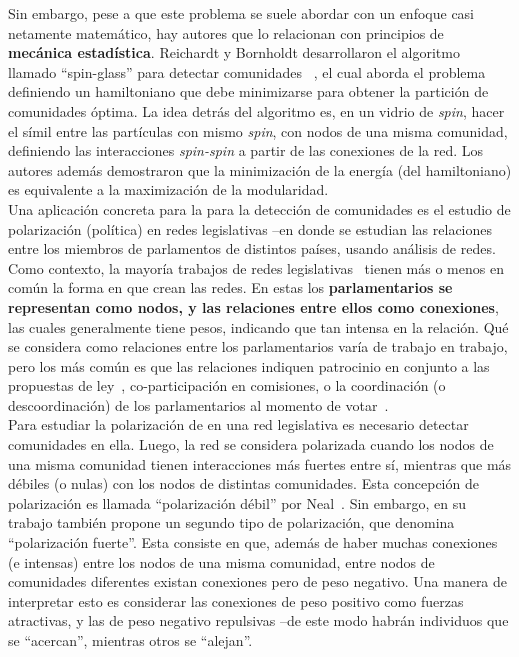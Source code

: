 \documentclass{proyectotesis}
\begin{document}
Sin embargo, pese a que este problema se suele abordar con un enfoque casi netamente matemático, hay autores que lo relacionan con principios de \textbf{mecánica estadística}. Reichardt y Bornholdt desarrollaron el algoritmo llamado ``spin-glass'' para detectar comunidades ~\cite{reichardt_statistical_2006}, el cual aborda el problema definiendo un hamiltoniano que debe minimizarse para obtener la partición de comunidades óptima. La idea detrás del algoritmo es, en un vidrio de \textit{spin}, hacer el símil entre las partículas con mismo \textit{spin}, con nodos de una misma comunidad, definiendo las interacciones \textit{spin-spin} a partir de las conexiones de la red. Los autores además demostraron que la minimización de la energía (del hamiltoniano) es equivalente a la maximización de la modularidad.\\

Una aplicación concreta para la para la detección de comunidades es el estudio de polarización (política) en redes legislativas --en donde se estudian las relaciones entre los miembros de  parlamentos de distintos países, usando análisis de redes.\\

Como contexto, la mayoría trabajos de redes legislativas~\cite{neal_sign_2020, marenco_time_2020, intal_dissent_2021, schoch_legislators_2020, aleman_explaining_2013, zhang_community_2007, fowler_connecting_2007, andris_rise_2015, briatte_network_2016, le_foulon_moran_cooperation_2020}
tienen más o menos en común la forma en que crean las redes. En estas los \textbf{parlamentarios se representan como nodos, y las relaciones entre ellos como conexiones}, las cuales generalmente tiene pesos, indicando que tan intensa en la relación. Qué se considera como relaciones entre los parlamentarios varía de trabajo en trabajo, pero los más común es que las relaciones indiquen patrocinio en conjunto a las propuestas de ley~\cite{neal_sign_2020, zhang_community_2007, le_foulon_moran_cooperation_2020,fowler_connecting_2007}, co-participación en comisiones, o la coordinación (o descoordinación) de los parlamentarios al momento de votar~\cite{andris_rise_2015, marenco_time_2020, schoch_legislators_2020, intal_dissent_2021}.\\

Para estudiar la polarización de en una red legislativa es necesario detectar comunidades en ella. Luego, la red se considera polarizada cuando los nodos de una misma comunidad tienen interacciones más fuertes entre sí, mientras que más débiles (o nulas) con los nodos de distintas comunidades. Esta concepción de polarización es llamada ``polarización débil'' por Neal~\cite{neal_sign_2020}. Sin embargo, en su trabajo también propone un segundo tipo de polarización, que denomina ``polarización fuerte''. Esta consiste en que, además de haber muchas conexiones (e intensas) entre los nodos de una misma comunidad, entre nodos de comunidades diferentes existan conexiones pero de peso negativo. Una manera de interpretar esto es considerar las conexiones de peso positivo como fuerzas atractivas, y las de peso negativo repulsivas --de este modo habrán individuos que se ``acercan'', mientras otros se ``alejan''.\\
\end{document}
